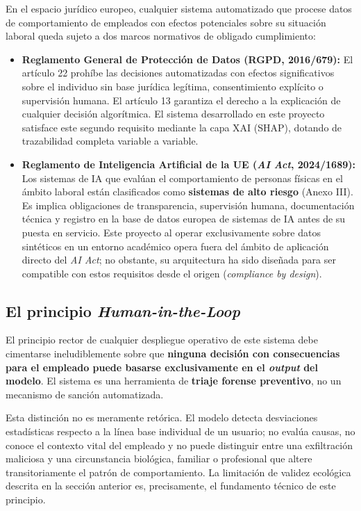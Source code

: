 \documentclass[IB]{TFUOC}%
\begin{document}
En el espacio jurídico europeo, cualquier sistema automatizado que procese 
datos de comportamiento de empleados con efectos potenciales sobre su 
situación laboral queda sujeto a dos marcos normativos de obligado 
cumplimiento:

\begin{itemize}
    \item \textbf{Reglamento General de Protección de Datos (RGPD, 
    2016/679):} El artículo 22 prohíbe las decisiones automatizadas 
    con efectos significativos sobre el individuo sin base jurídica 
    legítima, consentimiento explícito o supervisión humana. El 
    artículo 13 garantiza el derecho a la explicación de cualquier 
    decisión algorítmica. El sistema desarrollado en este proyecto 
    satisface este segundo requisito mediante la capa XAI (SHAP), 
    dotando de trazabilidad completa variable a variable.
    
    \item \textbf{Reglamento de Inteligencia Artificial de la UE 
    (\textit{AI Act}, 2024/1689):} Los sistemas de IA que evalúan 
    el comportamiento de personas físicas en el ámbito laboral 
    están clasificados como \textbf{sistemas de alto riesgo} 
    (Anexo III). Es implica obligaciones de transparencia, 
    supervisión humana, documentación técnica y registro en la 
    base de datos europea de sistemas de IA antes de su puesta 
    en servicio. Este proyecto al operar exclusivamente sobre 
    datos sintéticos en un entorno académico opera fuera del 
    ámbito de aplicación directo del \textit{AI Act}; no obstante, 
    su arquitectura ha sido diseñada para ser compatible con estos 
    requisitos desde el origen (\textit{compliance by design}).
\end{itemize}

\subsection*{El principio \textit{Human-in-the-Loop}}

El principio rector de cualquier despliegue operativo de este sistema 
debe cimentarse ineludiblemente sobre que \textbf{ninguna decisión con consecuencias para el empleado puede basarse exclusivamente en el \textit{output} del modelo}. El sistema 
es una herramienta de \textbf{triaje forense preventivo}, no un mecanismo de sanción automatizada.

\medskip
\noindent Esta distinción no es meramente retórica. El modelo detecta desviaciones estadísticas respecto a la línea base individual de un usuario; no evalúa causas, no conoce el contexto vital del empleado y no puede distinguir entre una exfiltración maliciosa y una 
circunstancia biológica, familiar o profesional que altere transitoriamente el patrón de comportamiento. La limitación de validez ecológica descrita en la sección anterior es, precisamente, el fundamento técnico de este principio.
\end{document}
